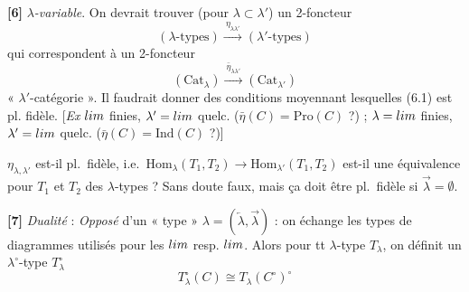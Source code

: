 \documentclass[11pt,a4paper]{article}
\begin{document}
\textbf{[6]} \emph{$\lambda$-variable}. On devrait trouver (pour
$\lambda \subset \lambda'$) un 2-foncteur
\begin{equation}
  (\lambda\text{-types}) \xrightarrow{\ \eta_{\lambda\lambda'}\ }
  (\lambda'\text{-types})
  \tag{6.1}
\end{equation}
qui correspondent à un 2-foncteur
\begin{equation}
  (\mathrm{Cat}_{\lambda}) \xrightarrow{\ \bar{\eta}_{\lambda\lambda'}\ }
  (\mathrm{Cat}_{\lambda'})
  \tag{6.2}
\end{equation}
« $\lambda'$-catégorie  ». Il faudrait donner
des conditions moyennant lesquelles (6.1) est pl. fidèle. [\emph{Ex}
\struck{\ill{}} $\varprojlim$ finies, $\lambda' = \varprojlim$ quelc.
($\bar{\eta}(C) = \mathrm{Pro}(C)$ ?) ; $\lambda = \varinjlim$ finies,
$\lambda' = \varinjlim$ quelc. ($\bar{\eta}(C) = \mathrm{Ind}(C)$ ?)]

 $\eta_{\lambda,\lambda'}$
est-il  \struck{\ill{}} pl.\ fidèle, i.e.\ $\mathrm{Hom}_{\lambda}(T_{1},
T_{2}) \to \mathrm{Hom}_{\lambda'}(T_{1}, T_{2})$ est-il  une
équivalence pour $T_{1}$ et $T_{2}$ des $\lambda$-types ? Sans doute
faux, mais ça doit être pl.\ fidèle si $\overrightarrow{\lambda} = \emptyset$.

\textbf{[7]} \emph{Dualité} : \emph{Opposé} d'un « type »
$\lambda = (\overleftarrow{\lambda}, \overrightarrow{\lambda})$ : on
échange les types de diagrammes utilisés pour les $\varprojlim$
resp. $\varinjlim$. Alors pour tt $\lambda$-type $T_{\lambda}$, on
définit un $\lambda^{\circ}$-type $T^{\circ}_{\lambda}$ 
\begin{equation}
  T^{\circ}_{\lambda}(C) \cong T_{\lambda}(C^{\circ})^{\circ}
  \tag{7.1}
\end{equation}
\end{document}

